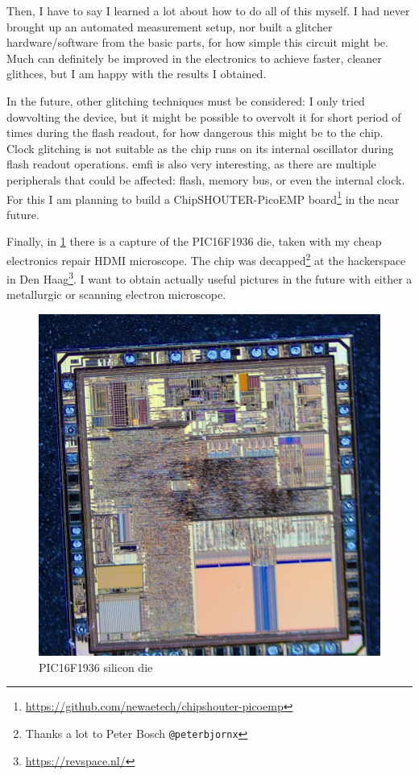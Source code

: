 \documentclass[a4paper,english,twoside,10pt]{article}
\begin{document}
Then, I have to say I learned a lot about how to do all of this myself. I had never brought up an automated measurement setup, nor built a glitcher hardware/software from the basic parts, for how simple this circuit might be. Much can definitely be improved in the electronics to achieve faster, cleaner glithces, but I am happy with the results I obtained.

In the future, other glitching techniques must be considered: I only tried dowvolting the device, but it might be possible to overvolt it for short period of times during the flash readout, for how dangerous this might be to the chip. Clock glitching is not suitable as the chip runs on its internal oscillator during flash readout operations. \gls{emfi} is also very interesting, as there are multiple peripherals that could be affected: flash, memory bus, or even the internal clock. For this I am planning to build a ChipSHOUTER-PicoEMP board\footnote{\url{https://github.com/newaetech/chipshouter-picoemp}} in the near future.

Finally, in \cref{fig:pic_die} there is a capture of the PIC16F1936 die, taken with my cheap electronics repair HDMI microscope. The chip was decapped\footnote{Thanks a lot to Peter Bosch \texttt{@peterbjornx}} at the hackerspace in Den Haag\footnote{\url{https://revspace.nl/}}. I want to obtain actually useful pictures in the future with either a metallurgic or scanning electron microscope.

\begin{figure}[htbp]
	\centering%
	\includegraphics[width=.70\textwidth]{pic_die_HDMI_microscope.jpg}
	\caption{PIC16F1936 silicon die}
	\label{fig:pic_die}
\end{figure}
\end{document}
